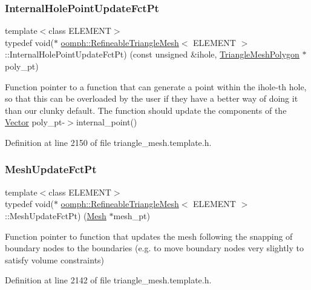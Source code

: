 \subsubsection{\texorpdfstring{Internal\+Hole\+Point\+Update\+Fct\+Pt}{InternalHolePointUpdateFctPt}}
{\footnotesize\ttfamily template$<$class E\+L\+E\+M\+E\+NT$>$ \\
typedef void($\ast$ \hyperlink{classoomph_1_1RefineableTriangleMesh}{oomph\+::\+Refineable\+Triangle\+Mesh}$<$ E\+L\+E\+M\+E\+NT $>$\+::Internal\+Hole\+Point\+Update\+Fct\+Pt) (const unsigned \&ihole, \hyperlink{classoomph_1_1TriangleMeshPolygon}{Triangle\+Mesh\+Polygon} $\ast$poly\+\_\+pt)}



Function pointer to a function that can generate a point within the ihole-\/th hole, so that this can be overloaded by the user if they have a better way of doing it than our clunky default. The function should update the components of the \hyperlink{classoomph_1_1Vector}{Vector} poly\+\_\+pt-\/$>$internal\+\_\+point() 



Definition at line 2150 of file triangle\+\_\+mesh.\+template.\+h.

\mbox{\label{classoomph_1_1RefineableTriangleMesh_aa78ffa56b66a1371aec25e25f7aaff9e}} 
\subsubsection{\texorpdfstring{Mesh\+Update\+Fct\+Pt}{MeshUpdateFctPt}}
{\footnotesize\ttfamily template$<$class E\+L\+E\+M\+E\+NT$>$ \\
typedef void($\ast$ \hyperlink{classoomph_1_1RefineableTriangleMesh}{oomph\+::\+Refineable\+Triangle\+Mesh}$<$ E\+L\+E\+M\+E\+NT $>$\+::Mesh\+Update\+Fct\+Pt) (\hyperlink{classoomph_1_1Mesh}{Mesh} $\ast$mesh\+\_\+pt)}



Function pointer to function that updates the mesh following the snapping of boundary nodes to the boundaries (e.\+g. to move boundary nodes very slightly to satisfy volume constraints) 



Definition at line 2142 of file triangle\+\_\+mesh.\+template.\+h.



